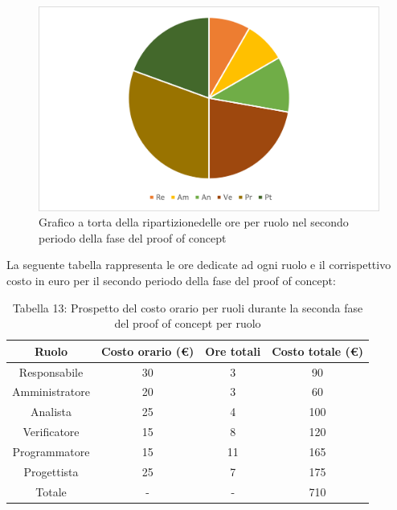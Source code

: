 \begin{figure}[H]
    \centering
    \includegraphics[scale=0.6]{img/grafi preventivo/torta/proof/periodo2.png}
    \caption{Grafico a torta della ripartizionedelle ore per ruolo nel secondo periodo della fase del proof of concept}
\end{figure}
La seguente tabella rappresenta le ore dedicate ad ogni ruolo e il corrispettivo costo in euro per il secondo periodo della fase del proof of concept:
\begin{table}[h]
	\setlength\extrarowheight{5pt}
	\centering
	\begin{tabularx}{\textwidth}{|ccc|c|}
		\hline
		\rowcolor{white}
		\textbf{Ruolo} & \textbf{Costo orario (€)} & \textbf{Ore totali} & \textbf{Costo totale (€)} \\
		\hline
		Responsabile &30&3&90 \\
		Amministratore &20&3&60 \\
		Analista &25&4&100 \\
		Verificatore &15&8&120 \\
		Programmatore &15&11&165 \\
		Progettista &25&7&175 \\
		\hline
		Totale &-&-&710 \\
		\hline
	\end{tabularx}
    \vspace{10pt}
	\caption{Tabella 13: Prospetto del costo orario per ruoli durante la seconda fase del proof of concept per ruolo}
\end{table}
